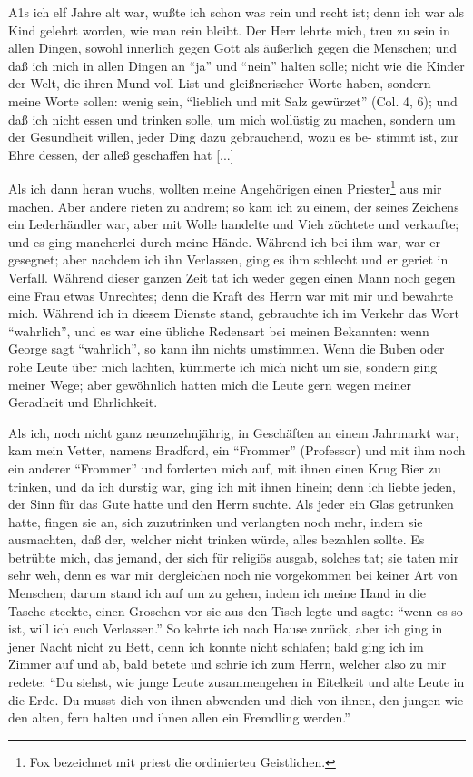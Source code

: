 A1s ich elf Jahre alt war, wußte ich schon was rein und
recht ist; denn ich war als Kind gelehrt worden, wie man rein
bleibt. Der Herr lehrte mich, treu zu sein in allen Dingen, sowohl
innerlich gegen Gott als äußerlich gegen die Menschen; und daß
ich mich in allen Dingen an "`ja"' und "`nein"' halten solle; nicht
wie die Kinder der Welt, die ihren Mund voll List und gleißnerischer
Worte haben, sondern meine Worte sollen: wenig sein, "`lieblich
und mit Salz gewürzet"' (Col. 4, 6); und daß ich nicht essen
und trinken solle, um mich wollüstig zu machen, sondern um der
Gesundheit willen, jeder Ding dazu gebrauchend, wozu es be-
stimmt ist, zur Ehre dessen, der alleß geschaffen hat [...]

Als ich dann heran wuchs, wollten meine Angehörigen einen
Priester\footnote{Fox bezeichnet mit priest die ordinierteu Geistlichen.} 
aus mir machen. Aber andere rieten zu andrem; so
kam ich zu einem, der seines Zeichens ein Lederhändler war, aber
mit Wolle handelte und Vieh züchtete und verkaufte; und es ging
mancherlei durch meine Hände. Während ich bei ihm war,
war er gesegnet; aber nachdem ich ihn Verlassen, ging es ihm
schlecht und er geriet in Verfall. Während dieser ganzen Zeit
tat ich weder gegen einen Mann noch gegen eine Frau etwas
Unrechtes; denn die Kraft des Herrn war mit mir und bewahrte
mich. Während ich in diesem Dienste stand, gebrauchte ich im
Verkehr das Wort "`wahrlich"', und es war eine übliche Redensart
bei meinen Bekannten: wenn George sagt "`wahrlich"', so kann
ihn nichts umstimmen. Wenn die Buben oder rohe Leute über
mich lachten, kümmerte ich mich nicht um sie, sondern ging meiner
Wege; aber gewöhnlich hatten mich die Leute gern wegen meiner
Geradheit und Ehrlichkeit.

Als ich, noch nicht ganz neunzehnjährig, in Geschäften an
einem Jahrmarkt war, kam mein Vetter, namens Bradford, ein
"`Frommer"' (Professor) und mit ihm noch ein anderer "`Frommer"'
und forderten mich auf, mit ihnen einen Krug Bier zu trinken,
und da ich durstig war, ging ich mit ihnen hinein; denn ich
liebte jeden, der Sinn für das Gute hatte und den Herrn
suchte. Als jeder ein Glas getrunken hatte, fingen sie an, sich
zuzutrinken und verlangten noch mehr, indem sie ausmachten,
daß der, welcher nicht trinken würde, alles bezahlen sollte. Es
betrübte mich, das jemand, der sich für religiös ausgab, solches
tat; sie taten mir sehr weh, denn es war mir dergleichen noch
nie vorgekommen bei keiner Art von Menschen; darum stand ich
auf um zu gehen, indem ich meine Hand in die Tasche steckte,
einen Groschen vor sie aus den Tisch legte und sagte: "`wenn es
so ist, will ich euch Verlassen."' So kehrte ich nach Hause zurück,
aber ich ging in jener Nacht nicht zu Bett, denn ich konnte nicht
schlafen; bald ging ich im Zimmer auf und ab, bald betete und
schrie ich zum Herrn, welcher also zu mir redete: "`Du siehst, wie
junge Leute zusammengehen in Eitelkeit und alte Leute in die
Erde. Du musst dich von ihnen abwenden und dich von ihnen,
den jungen wie den alten, fern halten und ihnen allen ein
Fremdling werden."'

